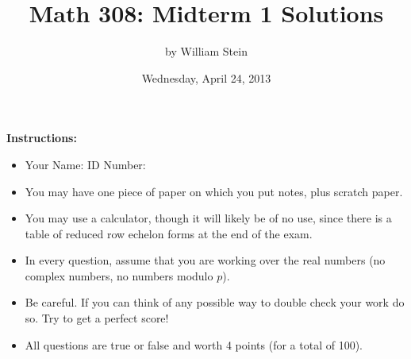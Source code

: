 \documentclass[11pt]{article}
\title{\color{blue}\bf Math 308: Midterm 1 Solutions}
\date{Wednesday, April 24, 2013}
\author{by William Stein}
\begin{document}
\maketitle
{\noindent\bf\color{red} Instructions:}
\begin{itemize}
\item {\color{blue} Your Name: \underline{\hspace{20em}}   ID Number: \underline{\hspace{10em}}}
\item You may have one piece of paper on which you put notes, plus scratch paper.
\item You may use a calculator, though it will likely be of no use, since there is a table of reduced row echelon forms at the end of the exam.
\item In every question, assume that you are working over the real numbers (no complex numbers, no numbers modulo $p$).
\item Be careful.  If you can think of any possible way to double check your work do so.  Try to get a perfect score!
\item All questions are true or false and worth 4 points (for a total of 100).
\end{itemize}
\end{document}
